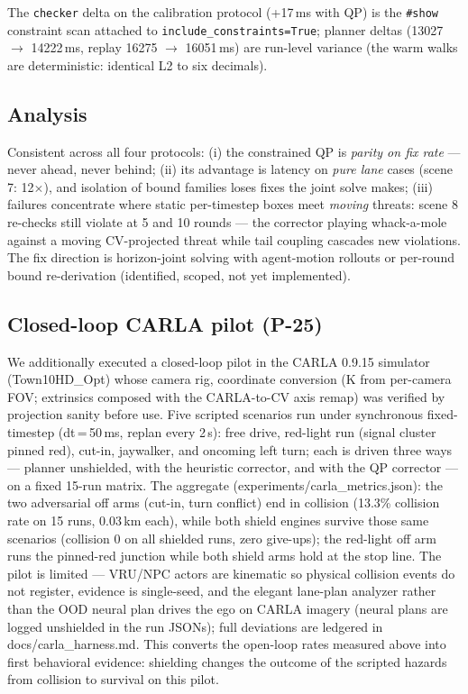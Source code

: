\documentclass[11pt]{article}
\begin{document}
The \texttt{checker} delta on the calibration protocol (+17\,ms with
QP) is the \texttt{\#show} constraint scan attached to
\texttt{include\_constraints=True}; planner deltas
(13027 $\to$ 14222\,ms, replay 16275 $\to$ 16051\,ms) are run-level
variance (the warm walks are deterministic: identical L2 to six
decimals).

\subsection{Analysis}
Consistent across all four protocols: (i) the constrained QP is
\emph{parity on fix rate} --- never ahead, never behind; (ii) its
advantage is latency on \emph{pure lane} cases (scene 7: 12$\times$),
and isolation of bound families loses fixes the joint solve makes; (iii)
failures concentrate where static per-timestep boxes meet
\emph{moving} threats: scene 8 re-checks still violate at 5 and 10
rounds --- the corrector playing whack-a-mole against a moving
CV-projected threat while tail coupling cascades new violations. The
fix direction is horizon-joint solving with agent-motion rollouts
or per-round bound re-derivation (identified, scoped, not yet
implemented).

\subsection{Closed-loop CARLA pilot (P-25)}
\label{sec:carla}
We additionally executed a closed-loop pilot in the CARLA 0.9.15
simulator (Town10HD\_Opt) whose camera rig, coordinate conversion
(K from per-camera FOV; extrinsics composed with the CARLA-to-CV
axis remap) was verified by projection sanity before use. Five
scripted scenarios run under synchronous fixed-timestep (dt\,=\,50\,ms,
replan every 2\,s): free drive, red-light run (signal cluster pinned
red), cut-in, jaywalker, and oncoming left turn; each is driven three
ways --- planner unshielded, with the heuristic corrector, and with
the QP corrector --- on a fixed 15-run matrix. The aggregate
(experiments/carla\_metrics.json): the two adversarial off arms
(cut-in, turn conflict) end in collision (13.3\% collision rate on 15
runs, 0.03\,km each), while both shield engines survive those same
scenarios (collision 0 on all shielded runs, zero give-ups); the
red-light off arm runs the pinned-red junction while both shield arms
hold at the stop line. The pilot is limited --- VRU/NPC actors are
kinematic so physical collision events do not register, evidence is
single-seed, and the elegant lane-plan analyzer rather than the OOD
neural plan drives the ego on CARLA imagery (neural plans are logged
unshielded in the run JSONs); full deviations are ledgered in
docs/carla\_harness.md. This converts the open-loop rates measured
above into first behavioral evidence:
shielding changes the outcome of the scripted hazards from collision
to survival on this pilot.
\end{document}
